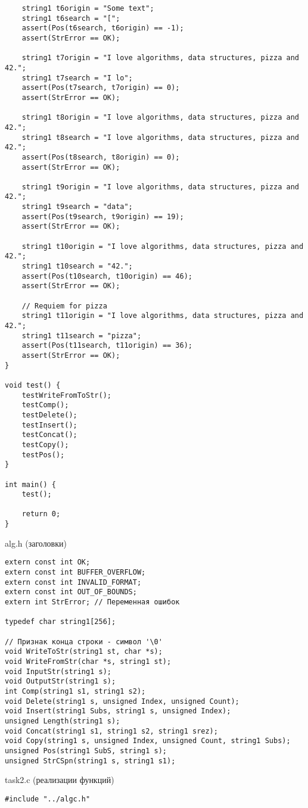 \documentclass[a4paper,14pt]{extarticle}
\begin{document}
\begin{enumerate}
\begin{verbatim}
    string1 t6origin = "Some text";
    string1 t6search = "[";
    assert(Pos(t6search, t6origin) == -1);
    assert(StrError == OK);

    string1 t7origin = "I love algorithms, data structures, pizza and 42.";
    string1 t7search = "I lo";
    assert(Pos(t7search, t7origin) == 0);
    assert(StrError == OK);

    string1 t8origin = "I love algorithms, data structures, pizza and 42.";
    string1 t8search = "I love algorithms, data structures, pizza and 42.";
    assert(Pos(t8search, t8origin) == 0);
    assert(StrError == OK);

    string1 t9origin = "I love algorithms, data structures, pizza and 42.";
    string1 t9search = "data";
    assert(Pos(t9search, t9origin) == 19);
    assert(StrError == OK);

    string1 t10origin = "I love algorithms, data structures, pizza and 42.";
    string1 t10search = "42.";
    assert(Pos(t10search, t10origin) == 46);
    assert(StrError == OK);

    // Requiem for pizza
    string1 t11origin = "I love algorithms, data structures, pizza and 42.";
    string1 t11search = "pizza";
    assert(Pos(t11search, t11origin) == 36);
    assert(StrError == OK);
}

void test() {
    testWriteFromToStr();
    testComp();
    testDelete();
    testInsert();
    testConcat();
    testCopy();
    testPos();
}

int main() {
    test();
    
    return 0;
}
\end{verbatim}
alg.h (заголовки)
\begin{verbatim}
extern const int OK;
extern const int BUFFER_OVERFLOW;
extern const int INVALID_FORMAT;
extern const int OUT_OF_BOUNDS;
extern int StrError; // Переменная ошибок

typedef char string1[256];

// Признак конца строки - символ '\0'
void WriteToStr(string1 st, char *s);
void WriteFromStr(char *s, string1 st);
void InputStr(string1 s);
void OutputStr(string1 s);
int Comp(string1 s1, string1 s2);
void Delete(string1 s, unsigned Index, unsigned Count);
void Insert(string1 Subs, string1 s, unsigned Index);
unsigned Length(string1 s);
void Concat(string1 s1, string1 s2, string1 srez);
void Copy(string1 s, unsigned Index, unsigned Count, string1 Subs);
unsigned Pos(string1 SubS, string1 s);
unsigned StrCSpn(string1 s, string1 s1);
\end{verbatim}
task2.c (реализации функций)
\begin{verbatim}
#include "../algc.h"


\end{verbatim}
\end{enumerate}
\end{document}
